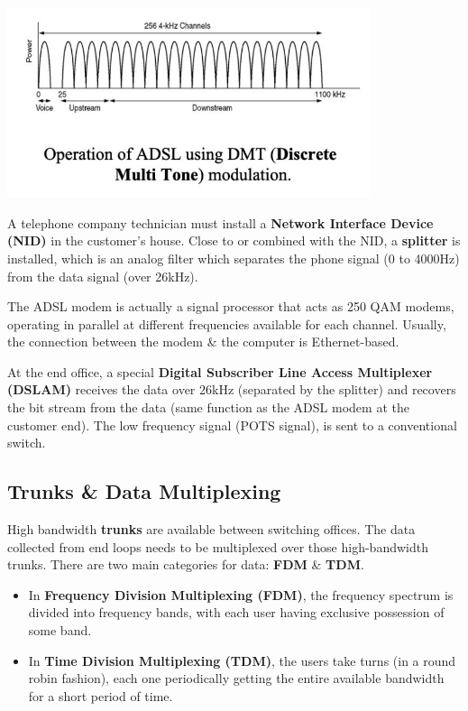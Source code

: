 \documentclass[11pt]{article}
\begin{document}
\begin{center}
    \includegraphics[width=0.8\textwidth]{dsl2.png}
\end{center}

A telephone company technician must install a \textbf{Network Interface Device (NID)} in the customer's house. 
Close to or combined with the NID, a \textbf{splitter} is installed, which is an analog filter which separates the phone signal 
(0 to 4000Hz) from the data signal (over 26kHz). 

The ADSL modem is actually a signal processor that acts as 250 QAM modems, operating in parallel at different frequencies 
available for each channel. 
Usually, the connection between the modem \& the computer is Ethernet-based. 

At the end office, a special \textbf{Digital Subscriber Line Access Multiplexer (DSLAM)} receives the data over 26kHz 
(separated by the splitter) and recovers the bit stream from the data (same function as the ADSL modem at the customer 
end). 
The low frequency signal (POTS signal), is sent to a conventional switch. 

\subsection{Trunks \& Data Multiplexing} 
High bandwidth \textbf{trunks} are available between switching offices. 
The data collected from end loops needs to be multiplexed over those high-bandwidth trunks. 
There are two main categories for data: \textbf{FDM} \& \textbf{TDM}. 
\begin{itemize}
    \item   In \textbf{Frequency Division Multiplexing (FDM)}, the frequency spectrum is divided into frequency bands, 
            with each user having exclusive possession of some band. 
    \item   In \textbf{Time Division Multiplexing (TDM)}, the users take turns (in a round robin fashion), each one 
            periodically getting the entire available bandwidth for a short period of time. 
\end{itemize}
\end{document}
